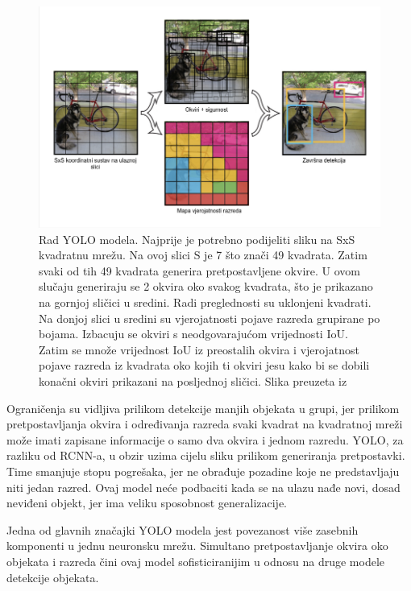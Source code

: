 \begin{figure}[htb]
    \centering
    \includegraphics[width=12cm]{img/YOLO-process.png}
    \caption{Rad YOLO modela. Najprije je potrebno podijeliti sliku na SxS kvadratnu mrežu. Na ovoj slici S je 7 što znači 49 kvadrata.
    Zatim svaki od tih 49 kvadrata generira pretpostavljene okvire. U ovom slučaju generiraju se 2 okvira oko svakog kvadrata, što je prikazano na gornjoj sličici u sredini.
    Radi preglednosti su uklonjeni kvadrati. Na donjoj slici u sredini su vjerojatnosti pojave razreda grupirane po bojama. Izbacuju se 
    okviri s neodgovarajućom vrijednosti IoU. Zatim se množe vrijednost IoU iz preostalih okvira i vjerojatnost pojave razreda iz kvadrata oko kojih ti okviri jesu
    kako bi se dobili konačni okviri prikazani na posljednoj sličici. 
     Slika preuzeta iz \citep{DBLP:journals/corr/RedmonDGF15}}
    \label{fig:Rad YOLO modela} 
\end{figure}

Ograničenja su vidljiva prilikom detekcije manjih objekata u grupi, jer prilikom pretpostavljanja okvira  i određivanja 
razreda svaki kvadrat na kvadratnoj mreži može imati zapisane informacije o samo dva okvira i jednom razredu. 
YOLO, za razliku od RCNN-a, u obzir uzima cijelu sliku prilikom generiranja pretpostavki. Time smanjuje
stopu pogrešaka, jer ne obrađuje pozadine koje ne predstavljaju niti jedan razred. Ovaj model neće podbaciti kada se na ulazu nađe novi, dosad neviđeni 
objekt, jer ima veliku sposobnost generalizacije.\citep{DBLP:journals/corr/RedmonDGF15}   

Jedna od glavnih značajki YOLO modela jest povezanost više zasebnih komponenti u jednu neuronsku mrežu. 
Simultano pretpostavljanje okvira oko objekata i razreda čini ovaj model sofisticiranijim u odnosu na druge modele detekcije objekata. 


